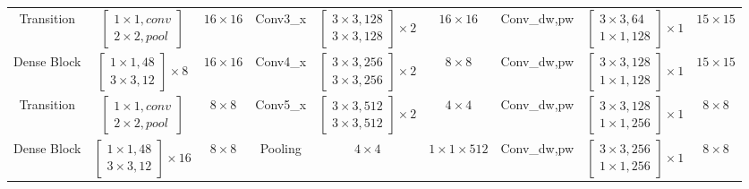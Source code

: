 \begin{table}[width=2\linewidth]
\begin{tabular*}{\tblwidth}{CCC|CCC|CCC}
Transition& $\begin{bmatrix}1\times1,conv\\2\times2,pool\end{bmatrix}$&$16\times16$&
Conv3\_x& $\begin{bmatrix}3\times3,128\\3\times3,128\end{bmatrix}\times2$& $16\times16$&
Conv\_dw,pw&$\begin{bmatrix}3\times3,64\\1\times1,128\end{bmatrix}\times1$ & $15\times15$\\ 
Dense Block& $\begin{bmatrix}1\times1,48\\3\times3,12\end{bmatrix}\times8$ &$16\times16$&
Conv4\_x& $\begin{bmatrix}3\times3,256\\3\times3,256\end{bmatrix}\times2$& $8\times8$&
Conv\_dw,pw&$\begin{bmatrix}3\times3,128\\1\times1,128\end{bmatrix}\times1$ & $15\times15$\\
Transition& $\begin{bmatrix}1\times1,conv\\2\times2,pool\end{bmatrix}$&$8\times8$&
Conv5\_x& $\begin{bmatrix}3\times3,512\\3\times3,512\end{bmatrix}\times2$& $4\times4$&
Conv\_dw,pw&$\begin{bmatrix}3\times3,128\\1\times1,256\end{bmatrix}\times1$ & $8\times8$ \\ 
Dense Block& $\begin{bmatrix}1\times1,48\\3\times3,12\end{bmatrix}\times16$ &$8\times8$&
Pooling& $4\times4$& $1\times1\times512$&
Conv\_dw,pw&$\begin{bmatrix}3\times3,256\\1\times1,256\end{bmatrix}\times1$ & $8\times8$\\

\end{tabular*}
\end{table}
